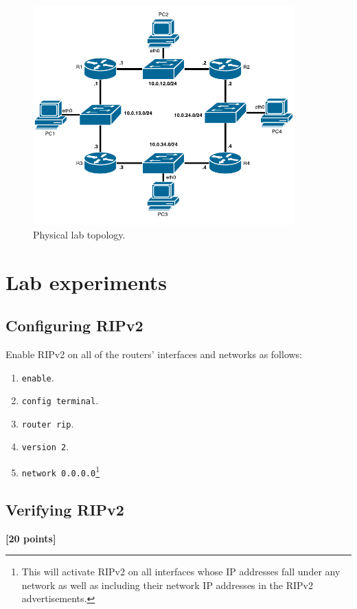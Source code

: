 \documentclass[pdftex,12pt,a4paper]{article}
\begin{document}
        \begin{figure}[tbh]
            \centering
            \includegraphics[width=0.9\textwidth]{figures/rip}
            \caption{Physical lab topology.}
            \label{fig:labtop}
        \end{figure}

    \section{Lab experiments}
        \subsection{Configuring RIPv2}
            Enable RIPv2 on all of the routers' interfaces and networks as follows:
            \begin{enumerate}
                \item \texttt{enable}.
                \item \texttt{config terminal}.
                \item \texttt{router rip}.
                \item \texttt{version 2}.
                \item \texttt{network 0.0.0.0}\footnote{This will activate
                    RIPv2 on all interfaces whose IP addresses fall under any
                    network as well as including their network IP addresses in the
                    RIPv2 advertisements.}
            \end{enumerate}

        \subsection{Verifying RIPv2}
            \begin{flushright}
                \textbf{[20 points]}
            \end{flushright}
\end{document}

